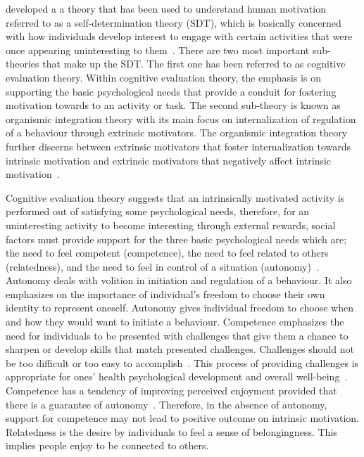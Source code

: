 \cite{deci1985:intrinsic} developed a a theory that has been used to understand human motivation referred to as a self-determination theory (SDT), which is basically concerned with how individuals develop interest to engage with certain activities that were once appearing uninteresting to them~\citep{ryan2000intrinsic}. There are two most important sub-theories that make up the SDT. The first one has been referred to as cognitive evaluation theory. Within cognitive evaluation theory, the emphasis is on supporting the basic psychological needs that provide a conduit for fostering motivation towards to an activity or task. The second sub-theory is known as organismic integration theory with its main focus on internalization of regulation of a behaviour through extrinsic motivators. The organismic integration theory further discerns between extrinsic motivators that foster internalization towards intrinsic motivation and extrinsic motivators that negatively affect intrinsic motivation~\citep{ryan2000:self,lee2015:relating}.

Cognitive evaluation theory suggests that an intrinsically motivated activity is performed out of satisfying some psychological needs, therefore, for an uninteresting activity to become interesting through external rewards, social factors must provide support for the three basic psychological needs which are; the need to feel competent (competence), the need to feel related to others (relatedness), and the need to feel in control of a situation (autonomy)~\citep{ryan2000intrinsic}. Autonomy deals with volition in initiation and regulation of a behaviour. It also emphasizes on the importance of individual's freedom to choose their own identity to represent oneself. Autonomy gives individual freedom to choose when and how they would want to initiate a behaviour. Competence emphasizes the need for individuals to be presented with challenges that give them a chance to sharpen or develop skills that match presented challenges. Challenges should not be too difficult or too easy to accomplish~\citep{zhang2008motivational,colineau2011motivating}. This process of providing challenges is appropriate for ones' health psychological development and  overall well-being~\citep{zhang2008motivational}. Competence has a tendency of improving perceived enjoyment provided that there is a guarantee of autonomy~\citep{forde2015informational}. Therefore, in the absence of autonomy, support for competence may not lead to positive outcome on intrinsic motivation. Relatedness is the desire by individuals to feel a sense of belongingness. This implies people enjoy to be connected to others.

